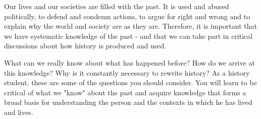 Our lives and our societies are filled with the past. It is used and abused politically, to defend and condemn actions, to argue for right and wrong and to explain why the world and society are as they are. Therefore, it is important that we have systematic knowledge of the past - and that we can take part in critical discussions about how history is produced and used.

What can we really know about what has happened before? How do we arrive at this knowledge? Why is it constantly necessary to rewrite history? As a history student, these are some of the questions you should consider. You will learn to be critical of what we "know" about the past and acquire knowledge that forms a broad basis for understanding the person and the contexts in which he has lived and lives.